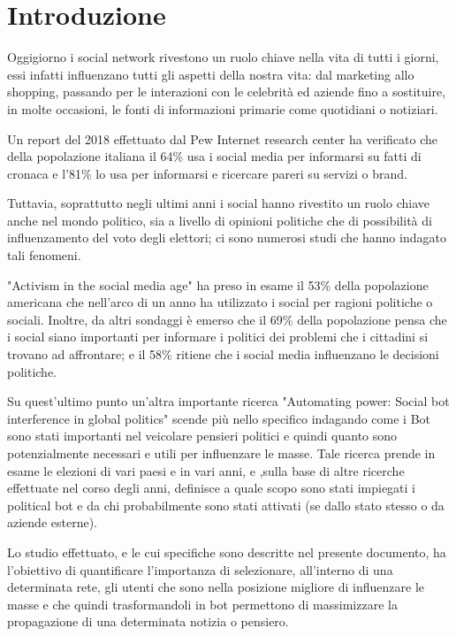 \section*{Introduzione}

    Oggigiorno i social network rivestono un ruolo chiave nella vita di tutti i giorni, essi infatti influenzano tutti gli aspetti della nostra vita: dal marketing allo shopping, passando per le interazioni con le celebrità ed aziende fino a sostituire, in molte occasioni, le fonti di informazioni primarie come quotidiani o notiziari.
    
    Un report del 2018 effettuato dal Pew Internet research center \cite{ReportPewInternetResearch2018} ha verificato che della popolazione italiana il 64\% usa i social media per informarsi su fatti di cronaca e l’81\% lo usa per informarsi e ricercare pareri su servizi o brand.
    
    Tuttavia, soprattutto negli ultimi anni i social hanno rivestito un ruolo chiave anche nel mondo politico, sia a livello di opinioni politiche che di possibilità di influenzamento del voto degli elettori; ci sono numerosi studi che hanno indagato tali fenomeni.
    
    "Activism in the social media age" \cite{ActivismSocialMedia} ha preso in esame il 53\% della popolazione americana che nell'arco di un anno ha utilizzato i social per ragioni politiche o sociali. Inoltre, da altri sondaggi è emerso che il 69\% della popolazione pensa che i social siano importanti per informare i politici dei problemi che i cittadini si trovano ad affrontare; e il 58\% ritiene che i social media influenzano le decisioni politiche.
    
    Su quest'ultimo punto un’altra importante ricerca "Automating power: Social bot interference in global politics" \cite{AutomaticPower} scende più nello specifico indagando come i Bot sono stati importanti nel veicolare pensieri politici e quindi quanto sono potenzialmente necessari e utili per influenzare le masse. Tale ricerca prende in esame le elezioni di vari paesi e in vari anni, e ,sulla base di altre ricerche effettuate nel corso degli anni, definisce a quale scopo sono stati impiegati i political bot e da chi probabilmente sono stati attivati (se dallo stato stesso o da aziende esterne).
    
    Lo studio effettuato, e le cui specifiche sono descritte nel presente documento, ha l’obiettivo di quantificare l’importanza di selezionare, all’interno di una determinata rete, gli utenti che sono nella posizione migliore di influenzare le masse e che quindi trasformandoli in bot permettono di massimizzare la propagazione di una determinata notizia o pensiero.